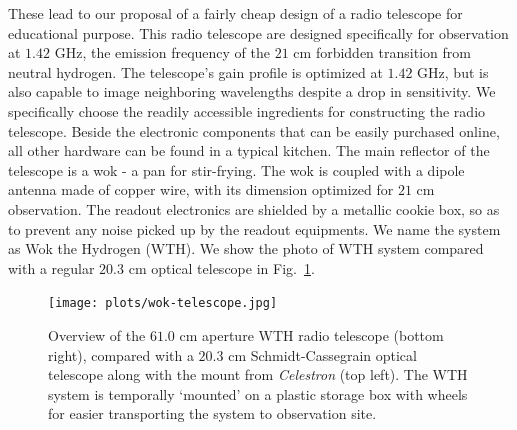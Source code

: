 \documentclass[12pt]{article}
\begin{document}
    These lead to our proposal of a fairly cheap design of a radio telescope for educational purpose.
    This radio telescope are designed specifically for observation at $1.42$ GHz, the emission frequency of the $21$ cm forbidden transition from neutral hydrogen.
    The telescope's gain profile is optimized at $1.42$ GHz, but is also capable to image neighboring wavelengths despite a drop in sensitivity.
    We specifically choose the readily accessible ingredients for constructing the radio telescope.
    Beside the electronic components that can be easily purchased online, all other hardware can be found in a typical kitchen.
    The main reflector of the telescope is a wok - a pan for stir-frying. 
    The wok is coupled with a dipole antenna made of copper wire, with its dimension optimized for $21$ cm observation.
    The readout electronics are shielded by a metallic cookie box, so as to prevent any noise picked up by the readout equipments.
    We name the system as Wok the Hydrogen (WTH).
    We show the photo of WTH system compared with a regular $20.3$ cm optical telescope in Fig.~\ref{fig: wok-overview}.

    \begin{figure}
	    \centering
	    \texttt{[image: plots/wok-telescope.jpg]}
	    \caption{Overview of the $61.0$ cm aperture WTH radio telescope (bottom right), compared with a $20.3$ cm Schmidt-Cassegrain optical telescope along with the mount from \textit{Celestron} (top left). The WTH system is temporally `mounted' on a plastic storage box with wheels for easier transporting the system to observation site.} 
	    \label{fig: wok-overview}
	\end{figure}
\end{document}
